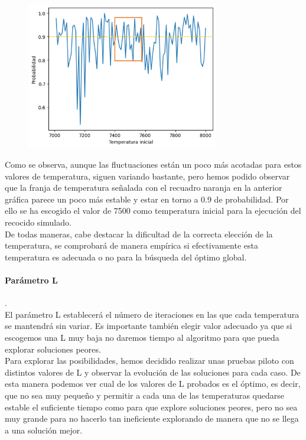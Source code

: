 \documentclass[a4paper,12pt]{article}
\begin{document}
	\begin{figure}[H]
		\centering
		\includegraphics[width=0.75\textwidth]{include/Temperaturas/grafico2.png}
	
	\end{figure}
	Como se observa, aunque las fluctuaciones están un poco más acotadas para estos valores de temperatura, siguen variando bastante, pero hemos podido observar que la franja de temperatura señalada con el recuadro naranja en la anterior gráfica parece un poco más estable y estar en torno a 0.9 de probabilidad.  Por ello se ha escogido el valor de 7500 como temperatura inicial para la ejecución del recocido simulado.\\

	De todas maneras, cabe destacar la dificultad de la correcta elección de la temperatura, se comprobará de manera empírica si efectivamente esta temperatura es adecuada o no para la búsqueda del óptimo global.

	\paragraph{Parámetro L}.\\
	El parámetro L establecerá el número de iteraciones en las que cada temperatura se mantendrá sin variar. Es importante también elegir valor adecuado ya que si escogemos una L muy baja no daremos tiempo al algoritmo para que pueda explorar soluciones peores.\\

	Para explorar las posibilidades, hemos decidido realizar unas pruebas piloto con distintos valores de L y observar la evolución de las soluciones para cada caso. De esta manera podemos ver cual de los valores de L probados es el óptimo, es decir, que no sea muy pequeño y permitir a cada una de las temperaturas quedarse estable el suficiente tiempo como para que explore soluciones peores, pero no sea muy grande para no hacerlo tan ineficiente explorando de manera que no se llega a una solución mejor.\\
\end{document}
